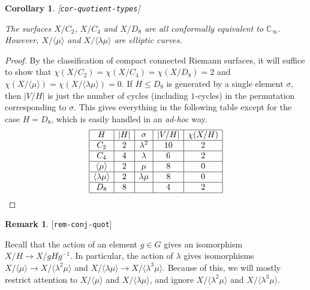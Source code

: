 \documentclass[reqno]{amsart}
\newcommand{\lbl}[1]{\label{#1}\textup{[\texttt{#1}]}\par}
\newcommand{\lbl}{\label}
\newcommand{\lm}        {\lambda}
\newcommand{\sg}        {\sigma}
\newcommand{\C}         {{\mathbb{C}}}
\newcommand{\ip}[1]     {\langle #1\rangle}
\renewcommand{\:}{\colon}
\newtheorem{corollary}[theorem]{Corollary}
\theoremstyle{definition}
\newtheorem{remark}[theorem]{Remark}
\begin{document}
\begin{corollary}\lbl{cor-quotient-types}
 The surfaces $X/C_2$, $X/C_4$ and $X/D_8$ are all conformally
 equivalent to $\C_\infty$.  However, $X/\ip{\mu}$ and $X/\ip{\lm\mu}$
 are elliptic curves.
\end{corollary}
\begin{proof}
 By the classification of compact connected Riemann surfaces, it will
 suffice to show that $\chi(X/C_2)=\chi(X/C_4)=\chi(X/D_8)=2$ and
 $\chi(X/\ip{\mu})=\chi(X/\ip{\lm\mu})=0$.  If $H\leq D_8$ is
 generated by a single element $\sg$, then $|V/H|$ is just the number
 of cycles (including $1$-cycles) in the permutation corresponding to
 $\sg$.  This gives everything in the following table except for the
 case $H=D_8$, which is easily handled in an \emph{ad-hoc} way.
 \[ \begin{array}{|c|c|c|c|c|}
     \hline
      H           & |H| & \sg    & |V/H| & \chi(X/H) \\ \hline
      C_2         & 2   & \lm^2  & 10    & 2         \\ \hline
      C_4         & 4   & \lm    & 6     & 2         \\ \hline
      \ip{\mu}    & 2   & \mu    & 8     & 0         \\ \hline
      \ip{\lm\mu} & 2   & \lm\mu & 8     & 0         \\ \hline
      D_8         & 8   &        & 4     & 2         \\ \hline
    \end{array}
 \]
\end{proof}

\begin{remark}\lbl{rem-conj-quot}
 Recall that the action of an element $g\in G$ gives an isomorphism
 $X/H\to X/gHg^{-1}$.  In particular, the action of $\lm$ gives
 isomorphisms $X/\ip{\mu}\to X/\ip{\lm^2\mu}$ and
 $X/\ip{\lm\mu}\to X/\ip{\lm^3\mu}$.  Because of this, we will mostly
 restrict attention to $X/\ip{\mu}$ and $X/\ip{\lm\mu}$, and ignore
 $X/\ip{\lm^2\mu}$ and $X/\ip{\lm^3\mu}$.
\end{remark}
\end{document}
